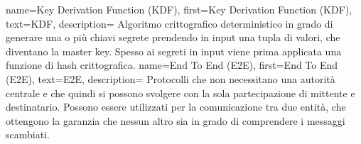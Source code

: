 {
    name={Key Derivation Function (KDF)},
    first={Key Derivation Function (KDF)},
    text={KDF},
    description={
            Algoritmo crittografico deterministico in grado di generare una o più chiavi segrete
            prendendo in input una tupla di valori, che diventano la master key.
            Spesso ai segreti in input viene prima applicata una funzione di hash crittografica.
        }
}
{
    name={End To End (E2E)},
    first={End To End (E2E)},
    text={E2E},
    description={
            Protocolli che non necessitano una autorità centrale e che quindi si possono svolgere con la sola partecipazione di mittente e destinatario.
            Possono essere utilizzati per la comunicazione tra due entità, che ottengono la garanzia che nessun altro sia in grado di comprendere
            i messaggi scambiati.
        }
}
